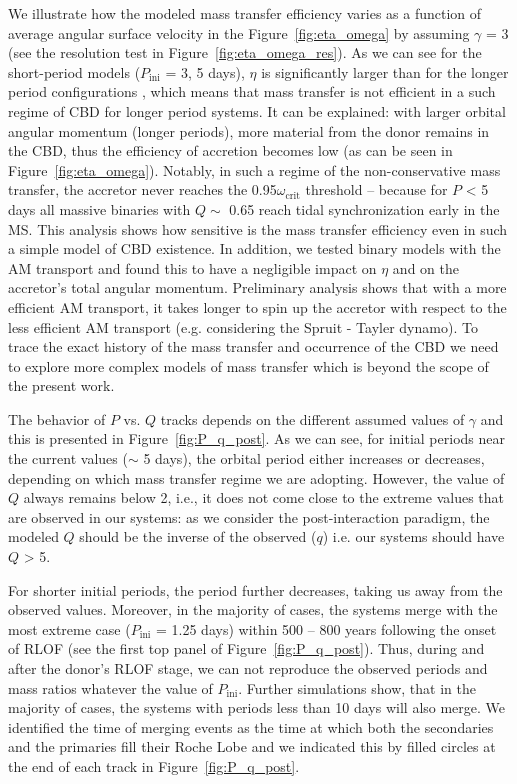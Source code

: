 \documentclass{aa}
\DeclareRobustCommand{\Figref}[1]{Figure~\ref{#1}}
\begin{document}
We illustrate how the modeled mass transfer efficiency varies as a function of average angular surface velocity in the \Figref{fig:eta_omega} by assuming $\gamma$ = 3 (see the resolution test in \Figref{fig:eta_omega_res}).
As we can see for the short-period models ($P_\mathrm{ini}$ = 3, 5 days), $\eta$ is significantly larger than for the longer period configurations \citep[as it has been also shown by][]{Sen_2022}, which means that mass transfer is not efficient in a such regime of CBD for longer period systems.
It can be explained: with larger orbital angular momentum (longer periods), more material from the donor remains in the CBD, thus the efficiency of accretion becomes low (as can be seen in \Figref{fig:eta_omega}).
Notably, in such a regime of the non-conservative mass transfer, the accretor never reaches the 0.95$\omega_\mathrm{crit}$ threshold --  because for $P$ < 5 days all massive binaries with $Q \sim$ 0.65 reach tidal synchronization early in the MS.
This analysis shows how sensitive is the mass transfer efficiency even in such a simple model of CBD existence.
In addition, we tested binary models with the \citet{fuller:19} AM transport and found this to have a negligible impact on $\eta$ and on the accretor's total angular momentum.
Preliminary analysis shows that with a more efficient AM transport, it takes longer to spin up the accretor with respect to the less efficient AM transport (e.g. considering the Spruit - Tayler dynamo).
To trace the exact history of the mass transfer and occurrence of the CBD we need to explore more complex models of mass transfer which is beyond the scope of the present work.



The behavior of $P$ vs. $Q$ tracks depends on the different assumed values of $\gamma$ and this is presented in \Figref{fig:P_q_post}.
As we can see, for initial periods near the current values ($\sim$ 5 days), the orbital period either increases or decreases, depending on which mass transfer regime we are adopting.
However, the value of $Q$ always remains below 2, i.e., it does not come close to the extreme values that are observed in our systems: as we consider the post-interaction paradigm, the modeled $Q$ should be the inverse of the observed ($q$) i.e. our systems should have $Q$ > 5.

For shorter initial periods, the period further decreases, taking us away from the observed values.
Moreover, in the majority of cases, the systems merge with the most extreme case ($P_\mathrm{ini}$ = 1.25 days) within 500 -- 800 years following the onset of RLOF (see the first top panel of
\Figref{fig:P_q_post}). Thus, during and after the donor's RLOF stage, we can not reproduce the observed periods and mass ratios whatever the value of $P_\mathrm{ini}$.
Further simulations show, that in the majority of cases, the systems with periods less than 10 days will also merge. We identified the time of merging events as the time at which both the secondaries and the primaries fill their Roche Lobe and we indicated this by filled circles at the end of each track in \Figref{fig:P_q_post}.
\end{document}
